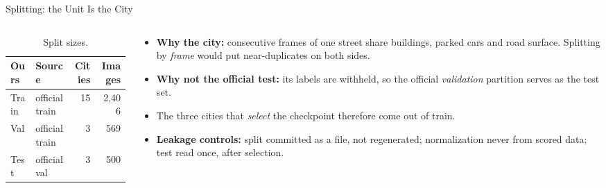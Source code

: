 \begin{frame}{Splitting: the Unit Is the City}
\begin{columns}[T]
\begin{column}{0.46\textwidth}
\begin{table}
\centering
\small
\caption{Split sizes.}
\label{tab:splits}
\begin{tabular}{llrr}
\toprule
\textbf{Ours} & \textbf{Source} & \textbf{Cities} & \textbf{Images} \\
\midrule
Train & official train & 15 & 2{,}406 \\
Val   & official train & 3  &   569 \\
Test  & official val   & 3  &   500 \\
\bottomrule
\end{tabular}
\end{table}
\end{column}
\begin{column}{0.52\textwidth}
\small
\begin{itemize}
    \item \textbf{Why the city:} consecutive frames of one street share buildings, parked cars and
          road surface. Splitting by \emph{frame} would put near-duplicates on both sides.
    \item \textbf{Why not the official test:} its labels are withheld, so the official
          \emph{validation} partition serves as the test set.
    \item The three cities that \emph{select} the checkpoint therefore come out of train.
    \item \textbf{Leakage controls:} split committed as a file, not regenerated; normalization
          never from scored data; test read once, after selection.
\end{itemize}
\end{column}
\end{columns}
\end{frame}
